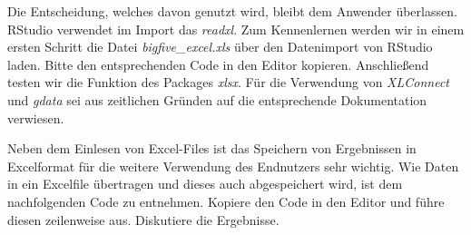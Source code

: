 \documentclass[]{article}
\begin{document}
Die Entscheidung, welches davon genutzt wird, bleibt dem Anwender
überlassen. RStudio verwendet im Import das \emph{readxl}. Zum
Kennenlernen werden wir in einem ersten Schritt die Datei
\emph{bigfive\_excel.xls} über den Datenimport von RStudio laden. Bitte
den entsprechenden Code in den Editor kopieren. Anschließend testen wir
die Funktion des Packages \emph{xlsx}. Für die Verwendung von
\emph{XLConnect} und \emph{gdata} sei aus zeitlichen Gründen auf die
entsprechende Dokumentation verwiesen.

Neben dem Einlesen von Excel-Files ist das Speichern von Ergebnissen in
Excelformat für die weitere Verwendung des Endnutzers sehr wichtig. Wie
Daten in ein Excelfile übertragen und dieses auch abgespeichert wird,
ist dem nachfolgenden Code zu entnehmen. Kopiere den Code in den Editor
und führe diesen zeilenweise aus. Diskutiere die Ergebnisse.
\end{document}
